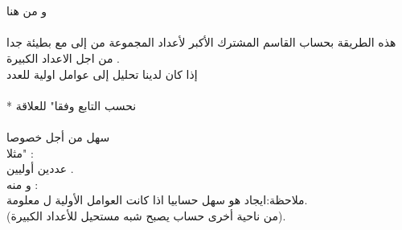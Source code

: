 \documentclass[11pt,a4paper]{report}
\begin{document}
\begin{otherlanguage}{arabic}
\begin{otherlanguage}{arabic}
\begin{center}
\\
 
\\
و من هنا 
\\
\textit{}
\\
هذه الطريقة بحساب القاسم المشترك الأكبر لأعداد المجموعة من  إلى  مع 
بطيئة جدا من اجل الاعداد الكبيرة .
\\
إذا كان لدينا تحليل إلى عوامل اولية للعدد 
\\
\\
* نحسب التابع \textLR{\phi} وفقا" للعلاقة 
\\
\textit{}
\\
\textit{\textLR{\phi}}  سهل من أجل \textit{} خصوصا
\\
\textit{} مثلا" : 
\\
 عددين أوليين .
\\
و منه :\textit{ }
\\
ملاحظة:ايجاد  هو سهل حسابيا اذا كانت العوامل الأولية ل  معلومة.
\\
(من ناحية أخرى حساب  يصبح شبه مستحيل للأعداد الكبيرة).






\end{center}
\end{otherlanguage}

\end{otherlanguage}
\end{document}
